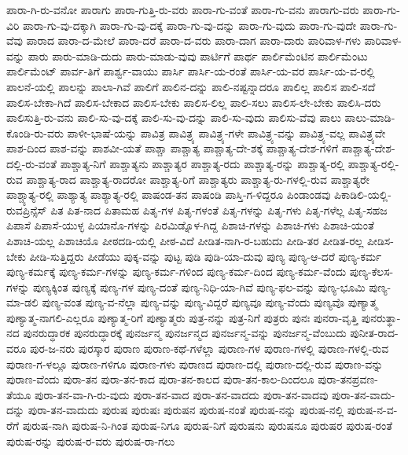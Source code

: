 {ಪಾರಾ-ಗಿ-ರು-ವನೋ
ಪಾರಾಗು
ಪಾರಾ-ಗುತ್ತಿ-ರು-ವರು
ಪಾರಾ-ಗು-ವಂತೆ
ಪಾರಾ-ಗು-ವನು
ಪಾರಾಗು-ವರು
ಪಾರಾ-ಗು-ವಿರಿ
ಪಾರಾ-ಗು-ವು-ದಕ್ಕಾಗಿ
ಪಾರಾ-ಗು-ವು-ದಕ್ಕೆ
ಪಾರಾ-ಗು-ವು-ದನ್ನು
ಪಾರಾ-ಗು-ವುದು
ಪಾರಾ-ಗು-ವುದೇ
ಪಾರಾ-ಗು-ವೆವು
ಪಾರಾದ
ಪಾರಾ-ದ-ಮೇಲೆ
ಪಾರಾ-ದರೆ
ಪಾರಾ-ದ-ವರು
ಪಾರಾ-ದಾಗ
ಪಾರಾ-ದಾರು
ಪಾರಿವಾಳ-ಗಳು
ಪಾರಿವಾಳ-ವನ್ನು
ಪಾರು
ಪಾರು-ಮಾಡಿ-ದುದು
ಪಾರು-ಮಾಡು-ವುವು
ಪಾರ್ಟಿಗೆ
ಪಾರ್ಥ
ಪಾರ್ಲಿಮೆಂಟಿನ
ಪಾರ್ಲಿಮೆಂಟು
ಪಾರ್ಲಿಮೆಂಟ್
ಪಾರ್ವ-ತಿಗೆ
ಪಾರ್ಶ್ವ-ವಾಯು
ಪಾರ್ಸಿ
ಪಾರ್ಸಿ-ಯ-ರಂತೆ
ಪಾರ್ಸಿ-ಯ-ವರ
ಪಾರ್ಸಿ-ಯ-ವ-ರಲ್ಲಿ
ಪಾಲನೆ-ಯಲ್ಲಿ
ಪಾಲನ್ನು
ಪಾಲಾ-ಗಿವೆ
ಪಾಲಿಗೆ
ಪಾಲಿನ-ದನ್ನು
ಪಾಲಿ-ನಷ್ಟನ್ನಾದರೂ
ಪಾಲಿಲ್ಲ
ಪಾಲಿಸ
ಪಾಲಿ-ಸದೆ
ಪಾಲಿಸ-ಬೇಕಾ-ಗಿದೆ
ಪಾಲಿಸ-ಬೇಕಾದ
ಪಾಲಿಸ-ಬೇಕು
ಪಾಲಿಸ-ಲಿಲ್ಲ
ಪಾಲಿ-ಸಲು
ಪಾಲಿಸ-ಲೇ-ಬೇಕು
ಪಾಲಿಸಿ-ದರು
ಪಾಲಿಸುತ್ತಿ-ರು-ವನು
ಪಾಲಿ-ಸು-ವು-ದಕ್ಕೆ
ಪಾಲಿ-ಸು-ವು-ದನ್ನು
ಪಾಲಿ-ಸು-ವುದು
ಪಾಲಿಸು-ವೆವು
ಪಾಲು
ಪಾಲು-ಮಾಡಿ-ಕೊಂಡಿ-ರು-ವರು
ಪಾಳೀ-ಭಾಷೆ-ಯನ್ನು
ಪಾವಿತ್ರ
ಪಾವಿತ್ರ್ಯ
ಪಾವಿತ್ರ್ಯ-ಗಳೇ
ಪಾವಿತ್ರ್ಯ-ವನ್ನು
ಪಾವಿತ್ರ್ಯ-ವಲ್ಲ
ಪಾವಿತ್ರ್ಯವೇ
ಪಾಶ-ದಿಂದ
ಪಾಶ-ವನ್ನು
ಪಾಶವೀ-ಯತೆ
ಪಾಶ್ಚಾ
ಪಾಶ್ಚಾತ್ಯ
ಪಾಶ್ಚಾತ್ಯ-ದೇ-ಶಕ್ಕೆ
ಪಾಶ್ಚಾತ್ಯ-ದೇಶ-ಗಳಿಗೆ
ಪಾಶ್ಚಾತ್ಯ-ದೇಶ-ದಲ್ಲಿ-ರು-ವಂತೆ
ಪಾಶ್ಚಾತ್ಯ-ನಿಗೆ
ಪಾಶ್ಚಾತ್ಯನು
ಪಾಶ್ಚಾತ್ಯರ
ಪಾಶ್ಚಾತ್ಯ-ರದು
ಪಾಶ್ಚಾತ್ಯ-ರನ್ನು
ಪಾಶ್ಚಾತ್ಯ-ರಲ್ಲಿ
ಪಾಶ್ಚಾತ್ಯ-ರಲ್ಲಿ-ರುವ
ಪಾಶ್ಚಾತ್ಯ-ರಾದ
ಪಾಶ್ಚಾತ್ಯ-ರಾದರೋ
ಪಾಶ್ಚಾತ್ಯ-ರಿಗೆ
ಪಾಶ್ಚಾತ್ಯರು
ಪಾಶ್ಚಾತ್ಯ-ರು-ಗಳಲ್ಲಿ-ರುವ
ಪಾಶ್ಚಾತ್ಯರೇ
ಪಾಶ್ಚ್ಯಾತ್ಯ-ರಲ್ಲಿ
ಪಾಶ್ಯಾತ್ಯ
ಪಾಶ್ಯಾತ್ಯ-ರಲ್ಲಿ
ಪಾಷಂಡ-ತನ
ಪಾಷಂಡಿ
ಪಾಸ್ತಿ-ಗ-ಳಿದ್ದರೂ
ಪಿಂಡಾಂಡವು
ಪಿಕಾಡಿಲಿ-ಯಲ್ಲಿ-ರುವಪ್ರಿನ್ಸೆಸ್
ಪಿತ
ಪಿತ-ನಾದ
ಪಿತಾಮಹ
ಪಿತೃ-ಗಳ
ಪಿತೃ-ಗಳಂತೆ
ಪಿತೃ-ಗಳನ್ನು
ಪಿತೃ-ಗಳು
ಪಿತೃ-ಗಳೆಲ್ಲ
ಪಿತೃ-ಸಹಜ
ಪಿಪಾಸೆ
ಪಿಪಾಸೆ-ಯುಳ್ಳ
ಪಿಯಾನೊ-ಗಳನ್ನು
ಪಿರಮಿಡ್ನೊಳ-ಗಿದ್ದ
ಪಿಶಾಚಿ-ಗಳನ್ನು
ಪಿಶಾಚಿ-ಗಳು
ಪಿಶಾಚಿ-ಯಂತೆ
ಪಿಶಾಚಿ-ಯಲ್ಲ
ಪಿಶಾಚಿಯೊ
ಪೀಠದಡಿ-ಯಲ್ಲಿ
ಪೀಠ-ವಿದೆ
ಪೀಡಿತ-ನಾಗಿ-ರ-ಬಹುದು
ಪೀಡಿ-ತರ
ಪೀಡಿತ-ರಲ್ಲ
ಪೀಡಿಸ-ಬೇಕು
ಪೀಡಿ-ಸುತ್ತಿದ್ದರು
ಪೀಡೆಯು
ಪುಕ್ಕ-ವನ್ನು
ಪುಟ್ಟ
ಪುಡಿ
ಪುಡಿ-ಯಾ-ದುವು
ಪುಣ್ಯ
ಪುಣ್ಯ-ಆ-ದರೆ
ಪುಣ್ಯ-ಕರ್ಮ
ಪುಣ್ಯ-ಕರ್ಮಕ್ಕೆ
ಪುಣ್ಯ-ಕರ್ಮ-ಗಳನ್ನು
ಪುಣ್ಯ-ಕರ್ಮ-ಗಳಿಂದ
ಪುಣ್ಯ-ಕರ್ಮ-ದಿಂದ
ಪುಣ್ಯ-ಕರ್ಮ-ವೆಂದು
ಪುಣ್ಯ-ಕೆಲಸ-ಗಳನ್ನು
ಪುಣ್ಯಕ್ಕಿಂತ
ಪುಣ್ಯಕ್ಕೆ
ಪುಣ್ಯ-ಗಳ
ಪುಣ್ಯ-ದಂತೆ
ಪುಣ್ಯ-ನಿಧಿ-ಯಾ-ಗಿವೆ
ಪುಣ್ಯ-ಫಲ-ವನ್ನು
ಪುಣ್ಯ-ಭೂಮಿ
ಪುಣ್ಯ-ಮಾ-ಡಲಿ
ಪುಣ್ಯ-ವಂತ
ಪುಣ್ಯ-ವ-ನೆಲ್ಲಾ
ಪುಣ್ಯ-ವನ್ನು
ಪುಣ್ಯ-ವಿದ್ದರೆ
ಪುಣ್ಯವೂ
ಪುಣ್ಯ-ವೆಂದು
ಪುಣ್ಯವೊ
ಪುಣ್ಯಾತ್ಮ
ಪುಣ್ಯಾತ್ಮ-ನಾಗಲಿ-ಎಲ್ಲರೂ
ಪುಣ್ಯಾತ್ಮ-ರಿಗೆ
ಪುಣ್ಯಾತ್ಮರು
ಪುತ್ರ-ನನ್ನು
ಪುತ್ರ-ನಿಗೆ
ಪುತ್ರರು
ಪುನಃ
ಪುನರಾ-ವೃತ್ತಿ
ಪುನರುತ್ಥಾ-ನದ
ಪುನರುದ್ಧಾರಕ
ಪುನರುದ್ಧಾರಕ್ಕೆ
ಪುನರ್ಜನ್ಮ
ಪುನರ್ಜನ್ಮದ
ಪುನರ್ಜನ್ಮ-ವನ್ನು
ಪುನರ್ಜನ್ಮ-ವೆಂಬುದು
ಪುನೀತ-ರಾದ-ವರೂ
ಪುರ-ಜ-ನರು
ಪುರಸ್ಕಾರ
ಪುರಾಣ
ಪುರಾಣ-ಕಥೆ-ಗಳೆಲ್ಲಾ
ಪುರಾಣ-ಗಳ
ಪುರಾಣ-ಗಳಲ್ಲಿ
ಪುರಾಣ-ಗಳಲ್ಲಿ-ರುವ
ಪುರಾಣ-ಗ-ಳಲ್ಲೂ
ಪುರಾಣ-ಗಳಿಗೂ
ಪುರಾಣ-ಗಳು
ಪುರಾಣದ
ಪುರಾಣ-ದಲ್ಲಿ
ಪುರಾಣ-ದಲ್ಲಿ-ರುವ
ಪುರಾಣ-ವನ್ನು
ಪುರಾಣ-ವೆಂದು
ಪುರಾ-ತನ
ಪುರಾ-ತನ-ಕಾದ
ಪುರಾ-ತನ-ಕಾಲದ
ಪುರಾ-ತನ-ಕಾಲ-ದಿಂದಲೂ
ಪುರಾ-ತನಪ್ರವಣ-ತೆಯೂ
ಪುರಾ-ತನ-ವಾ-ಗಿ-ರು-ವುದು
ಪುರಾ-ತನ-ವಾದ
ಪುರಾ-ತನ-ವಾದದು
ಪುರಾ-ತನ-ವಾದವು
ಪುರಾ-ತನ-ವಾದು-ದನ್ನು
ಪುರಾ-ತನ-ವಾದುದು
ಪುರುಷ
ಪುರುಷಃ
ಪುರುಷನ
ಪುರುಷ-ನಂತೆ
ಪುರುಷ-ನನ್ನು
ಪುರುಷ-ನಲ್ಲಿ
ಪುರುಷ-ನ-ವ-ರೆಗೆ
ಪುರುಷ-ನಾಗಿ
ಪುರುಷ-ನಿ-ಗಿಂತ
ಪುರುಷ-ನಿಗೂ
ಪುರುಷ-ನಿಗೆ
ಪುರುಷನು
ಪುರುಷನೂ
ಪುರುಷರ
ಪುರುಷ-ರಂತೆ
ಪುರುಷ-ರನ್ನು
ಪುರುಷ-ರ-ವರು
ಪುರುಷ-ರಾ-ಗಲು
}
